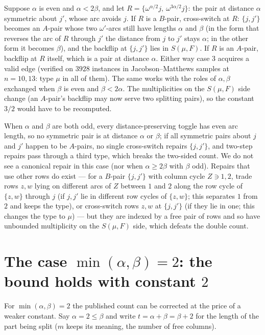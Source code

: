 \documentclass[11pt]{article}
\theoremstyle{remark}
\begin{document}
Suppose $\alpha$ is even and $\alpha<2\beta$, and let
$R=\{\omega^{\alpha/2}j,\ \omega^{3\alpha/2}j\}$: the pair at distance
$\alpha$ symmetric about $j'$, whose arc avoids $j$.  If $R$ is a
$B$-pair, cross-switch at $R$: $\{j,j'\}$ becomes an $A$-pair whose
two $\omega'$-arcs still have lengths $\alpha$ and $\beta$ (in the
form that reverses the arc of $R$ through $j'$ the distance from $j$
to $j'$ stays $\alpha$; in the other form it becomes $\beta$), and the
backflip at $\{j,j'\}$ lies in $S(\mu,F)$.
If $R$ is an $A$-pair, backflip at $R$ itself, which is a pair at
distance $\alpha$.  Either way case 3 acquires a valid edge
(verified on $3928$ instances in Jacobson--Matthews samples at $n=10,13$: type $\mu$ in all of
them).  The same works with the roles of $\alpha,\beta$ exchanged when
$\beta$ is even and $\beta<2\alpha$.  The multiplicities on the
$S(\mu,F)$ side change (an $A$-pair's backflip may now serve two
splitting pairs), so the constant $3/2$ would have to be recomputed.

When $\alpha$ and $\beta$ are both odd, every distance-preserving
toggle has even arc length, so no symmetric pair is at distance $\alpha$
or $\beta$; if all symmetric pairs about $j$ and $j'$ happen to be
$A$-pairs, no single cross-switch repairs $\{j,j'\}$, and two-step
repairs pass through a third type, which breaks the two-sided count.
We do not see a canonical repair in this case (nor when
$\alpha\ge2\beta$ with $\beta$ odd).  Repairs that use other rows do
exist --- for a $B$-pair $\{j,j'\}$ with column cycle $Z\ni1,2$, trade
rows $z,w$ lying on different arcs of $Z$ between $1$ and $2$ along
the row cycle of $\{z,w\}$ through $j$ (if $j,j'$ lie in different row
cycles of $\{z,w\}$; this separates $1$ from $2$ and keeps the type),
or cross-switch rows $z,w$ at $\{j,j'\}$ (if they lie in one; this
changes the type to $\mu$) --- but they are indexed by a free pair of
rows and so have unbounded multiplicity on the $S(\mu,F)$ side, which
defeats the double count.

\section{The case $\min(\alpha,\beta)=2$: the bound holds with constant $2$}

For $\min(\alpha,\beta)=2$ the published count can be corrected at the
price of a weaker constant.  Say $\alpha=2\le\beta$ and write
$t=\alpha+\beta=\beta+2$ for the length of the part being split ($m$
keeps its meaning, the number of free columns).
\end{document}
